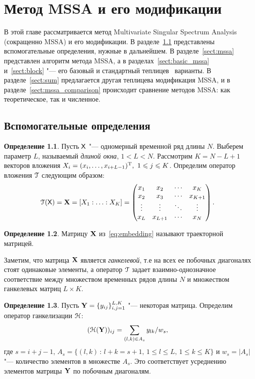 \documentclass[specialist,
substylefile = spbu_report.rtx,
subf,href,colorlinks=true, 12pt]{disser}
\theoremstyle{definition}
\newtheorem{definition}{Определение}
\begin{document}
\chapter{Метод MSSA и его модификации}\label{chpt:mssa}
В этой главе рассматривается метод Multivariate Singular Spectrum Analysis~\cite{Golyandina_2015} (сокращенно MSSA) и его модификации. В разделе~\ref{sect:definitions} представлены вспомогательные определения, нужные в дальнейшем. В разделе~\ref{sect:mssa} представлен алгоритм метода MSSA, а в разделах~\ref{sect:basic_mssa} и~\ref{sect:block} "--- его базовый и стандартный теплицев~\cite{Plaut1994SpellsOL} варианты. В разделе~\ref{sect:sum} предлагается другая теплицева модификация MSSA, и в разделе~\ref{sect:mssa_comparison} происходит сравнение методов MSSA: как теоретическое, так и численное.

\section{Вспомогательные определения}\label{sect:definitions}
\begin{definition}
	Пусть $\mathsf{X}$ "--- одномерный временной ряд длины $N$. Выберем параметр $L$, называемый \emph{длиной окна}, $1<L<N$. Рассмотрим $K=N-L+1$ векторов вложения $X_i=(x_{i},\ldots, x_{i+L-1})^{\mathrm{T}},\ 1\leqslant j \leqslant K$. Определим оператор вложения $\EuScript{T}$ следующим образом:
	\begin{equation}\label{eq:embedding}
		\EuScript{T}(\mathsf{X})=\mathbf{X}=[X_1:\ldots:X_K]=
		\begin{pmatrix}
			x_1    & x_2     & \cdots & x_K     \\
			x_2    & x_3     & \cdots & x_{K+1} \\
			\vdots & \vdots  & \ddots & \vdots  \\
			x_L    & x_{L+1} & \cdots & x_N
		\end{pmatrix}.
	\end{equation}
\end{definition}
\begin{definition}
	Матрицу $\mathbf{X}$ из~\eqref{eq:embedding} называют траекторной матрицей.
\end{definition}\noindent
Заметим, что матрица $\mathbf{X}$ является \emph{ганкелевой}, т.е на всех ее побочных диагоналях стоят одинаковые элементы, а оператор $\EuScript{T}$ задает взаимно-однозначное соответствие между множеством временных рядов длины $N$ и множеством ганкелевых матриц $L\times K$.
\begin{definition}
	Пусть $\mathbf{Y}=\{y_{ij}\}_{i,j=1}^{L,K}$ "--- некоторая матрица. Определим оператор ганкелизации $\EuScript{H}$:
	\begin{equation}\label{eq:averaging}
		(\EuScript{H}(\mathbf{Y}))_{ij}=\sum_{(l,k)\in A_s}y_{lk}/w_s,
	\end{equation}
	где $s=i+j-1$, $A_s=\{(l,k)\, :\, l+k=s+1,\, 1\leqslant l\leqslant L,\, 1\leqslant k\leqslant K\}$ и $w_s=|A_s|$ "--- количество элементов в множестве $A_s$. Это соответствует
	усреднению элементов матрицы $\mathbf{Y}$ по побочным диагоналям.
\end{definition}
\end{document}
